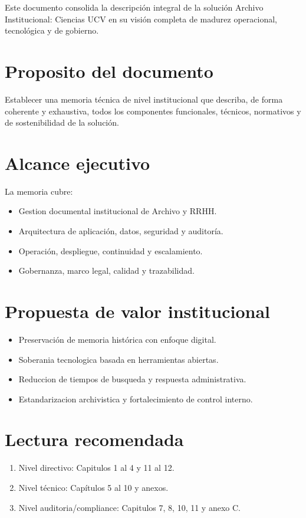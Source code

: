 Este documento consolida la descripción integral de la solución Archivo Institucional: Ciencias UCV en su visión completa de madurez operacional, tecnológica y de gobierno.

\section{Proposito del documento}
Establecer una memoria técnica de nivel institucional que describa, de forma coherente y exhaustiva, todos los componentes funcionales, técnicos, normativos y de sostenibilidad de la solución.

\section{Alcance ejecutivo}
La memoria cubre:
\begin{itemize}
  \item Gestion documental institucional de Archivo y RRHH.
  \item Arquitectura de aplicación, datos, seguridad y auditoría.
  \item Operación, despliegue, continuidad y escalamiento.
  \item Gobernanza, marco legal, calidad y trazabilidad.
\end{itemize}

\section{Propuesta de valor institucional}
\begin{itemize}
  \item Preservación de memoria histórica con enfoque digital.
  \item Soberania tecnologica basada en herramientas abiertas.
  \item Reduccion de tiempos de busqueda y respuesta administrativa.
  \item Estandarizacion archivistica y fortalecimiento de control interno.
\end{itemize}

\section{Lectura recomendada}
\begin{enumerate}
  \item Nivel directivo: Capitulos 1 al 4 y 11 al 12.
  \item Nivel técnico: Capítulos 5 al 10 y anexos.
  \item Nivel auditoria/compliance: Capitulos 7, 8, 10, 11 y anexo C.
\end{enumerate}
